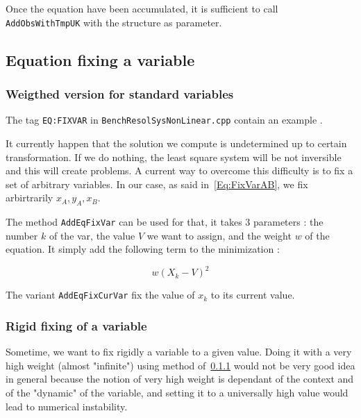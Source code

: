 Once the equation have been accumulated, it is sufficient to call {\tt AddObsWithTmpUK}
with the structure as parameter.


\subsection{Equation fixing a variable}

\subsubsection{Weigthed version for standard variables}

\label{WeightedFixVar}
The tag  {\tt  EQ:FIXVAR} in {\tt BenchResolSysNonLinear.cpp} contain an example .

It currently happen that the solution we compute is undetermined
up to  certain transformation.  If we do nothing, the least square
system will be not inversible and this will create problems.
A current way  to overcome this difficulty is to fix a set
of arbitrary variables.  In our case, as said in~\ref{Eq:FixVarAB}, 
we fix arbirtrarily $x_A,y_A,x_B$.  

The method {\tt AddEqFixVar} can be used for that, it takes $3$ parameters :
the number $k$ of the var, the value $V$ we want to assign, and the weight $w$
of the equation.  It simply add the following term  to the minimization :

\begin{equation}
      w (X_k -V)^2   
\end{equation}

The variant {\tt AddEqFixCurVar} fix the value of $x_k$ to its current value.


\subsubsection{Rigid fixing of a variable}

Sometime, we want to fix rigidly a variable to a given value.  Doing it with
a very high weight (almost "infinite") using method of~\ref{WeightedFixVar} would not be very 
good idea in general because the notion of very high weight is dependant of the context
and of the "dynamic" of the variable, and setting it to a universally  high value would lead to numerical 
instability.

